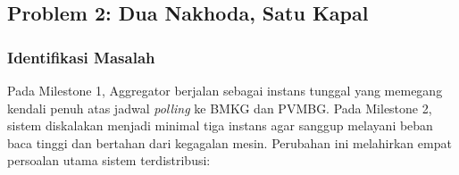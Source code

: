 \subsection{Problem 2: Dua Nakhoda, Satu Kapal}

\subsubsection{Identifikasi Masalah}

Pada Milestone 1, Aggregator berjalan sebagai instans tunggal yang memegang kendali penuh atas jadwal \textit{polling} ke BMKG dan PVMBG. Pada Milestone 2, sistem diskalakan menjadi minimal tiga instans agar sanggup melayani beban baca tinggi dan bertahan dari kegagalan mesin. Perubahan ini melahirkan empat persoalan utama sistem terdistribusi:

